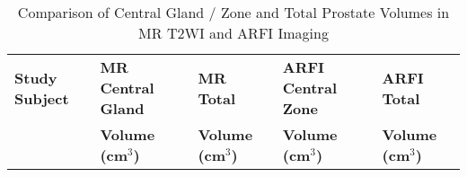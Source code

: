 \begin{table}[h!]
\centering
\caption{Comparison of Central Gland / Zone and Total Prostate Volumes in MR T2WI and ARFI Imaging}
\begin{tabular}{|l|l|l|l|l|} \hline
{\bf Study Subject} & {\bf MR Central Gland} & {\bf MR Total} & {\bf ARFI Central Zone} & {\bf ARFI Total} \\ 
& {\bf Volume (cm$^3$)} & {\bf Volume (cm$^3$)} & {\bf Volume (cm$^3$)} & {\bf Volume (cm$^3$)} \\ \hline

\hline
\end{tabular}
\label{tab:mr_arfi_volumes}
\end{table}
